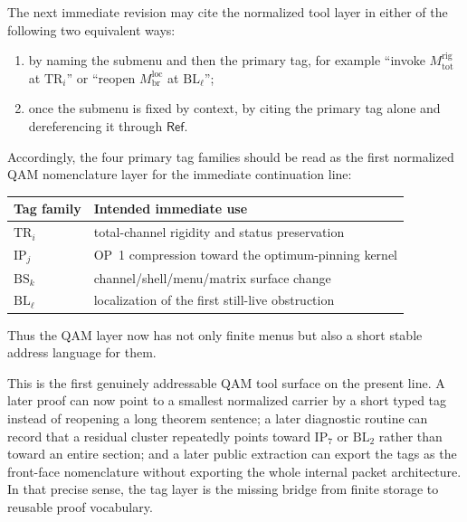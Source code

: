 \begin{corollary}
\label{cor:tag-first-citation-syntax-immediate-continuation-line}
The next immediate revision may cite the normalized tool layer in either of the following two equivalent ways:
\begin{enumerate}[leftmargin=2em]
  \item by naming the submenu and then the primary tag, for example ``invoke \(M^{\mathrm{rig}}_{\mathrm{tot}}\) at \(\mathrm{TR}_i\)'' or ``reopen \(M^{\mathrm{loc}}_{\mathrm{br}}\) at \(\mathrm{BL}_\ell\)'';
  \item once the submenu is fixed by context, by citing the primary tag alone and dereferencing it through \(\mathsf{Ref}\).
\end{enumerate}
Accordingly, the four primary tag families should be read as the first normalized QAM nomenclature layer for the immediate continuation line:
\begin{center}
\begin{tabular}{@{}ll@{}}
\toprule
Tag family & Intended immediate use \\
\midrule
\(\mathrm{TR}_i\) & total-channel rigidity and status preservation \\
\(\mathrm{IP}_j\) & OP~1 compression toward the optimum-pinning kernel \\
\(\mathrm{BS}_k\) & channel/shell/menu/matrix surface change \\
\(\mathrm{BL}_\ell\) & localization of the first still-live obstruction \\
\bottomrule
\end{tabular}
\end{center}
Thus the QAM layer now has not only finite menus but also a short stable address language for them.
\end{corollary}

\begin{remark}
\label{rem:what-tag-layer-buys-before-new-theorem}
This is the first genuinely addressable QAM tool surface on the present line. A later proof can now point to a smallest normalized carrier by a short typed tag instead of reopening a long theorem sentence; a later diagnostic routine can record that a residual cluster repeatedly points toward \(\mathrm{IP}_7\) or \(\mathrm{BL}_2\) rather than toward an entire section; and a later public extraction can export the tags as the front-face nomenclature without exporting the whole internal packet architecture. In that precise sense, the tag layer is the missing bridge from finite storage to reusable proof vocabulary.
\end{remark}



